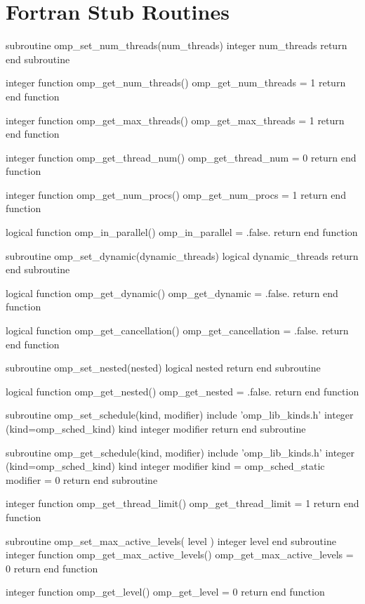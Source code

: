 \section{Fortran Stub Routines}
\label{sec:Fortran Stub Routines}
{\small \begin{codepar}
subroutine omp\_set\_num\_threads(num\_threads)
  integer num\_threads
  return
end subroutine

integer function omp\_get\_num\_threads()
  omp\_get\_num\_threads = 1
  return
end function

integer function omp\_get\_max\_threads()
  omp\_get\_max\_threads = 1
  return
end function

integer function omp\_get\_thread\_num()
  omp\_get\_thread\_num = 0
  return
end function

integer function omp\_get\_num\_procs()
  omp\_get\_num\_procs = 1
  return
end function

logical function omp\_in\_parallel()
  omp\_in\_parallel = .false.
  return
end function

subroutine omp\_set\_dynamic(dynamic\_threads)
  logical dynamic\_threads
  return
end subroutine

logical function omp\_get\_dynamic()
  omp\_get\_dynamic = .false.
  return
end function

logical function omp\_get\_cancellation()
  omp\_get\_cancellation = .false.
  return
end function

subroutine omp\_set\_nested(nested)
  logical nested
  return
end subroutine

logical function omp\_get\_nested()
  omp\_get\_nested = .false.
  return
end function

subroutine omp\_set\_schedule(kind, modifier)
  include 'omp\_lib\_kinds.h'
  integer (kind=omp\_sched\_kind) kind
  integer modifier
  return
end subroutine

subroutine omp\_get\_schedule(kind, modifier)
  include 'omp\_lib\_kinds.h'
  integer (kind=omp\_sched\_kind) kind
  integer modifier
  kind = omp\_sched\_static
  modifier = 0
  return
end subroutine

integer function omp\_get\_thread\_limit()
  omp\_get\_thread\_limit = 1
  return
end function

subroutine omp\_set\_max\_active\_levels( level )
  integer level
  end subroutine
  integer function omp\_get\_max\_active\_levels()
  omp\_get\_max\_active\_levels = 0
  return
end function

integer function omp\_get\_level()
  omp\_get\_level = 0
  return
end function


\end{codepar}}
